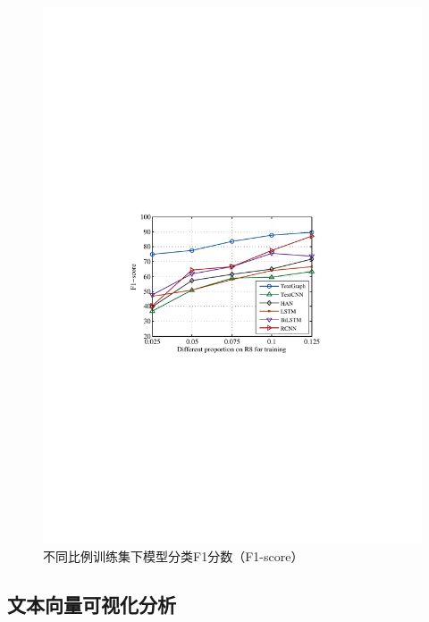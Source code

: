 \begin{figure}[htb]
\begin{minipage}[t]{0.5\linewidth}
    \includegraphics[width=1\textwidth]{pic/R8_f1-score.pdf}
    \caption{不同比例训练集下模型分类F1分数（F1-score）}
    \label{R8_f1-score}
    \end{minipage}
\end{figure}

\subsection{文本向量可视化分析}
